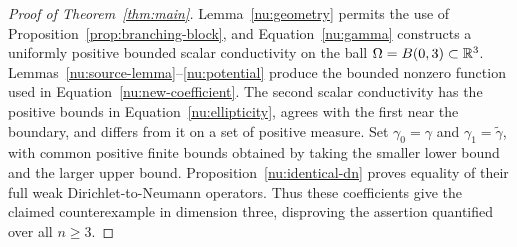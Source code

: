 \begin{proof}[Proof of Theorem~\ref{thm:main}]
Lemma~\ref{nu:geometry} permits the use of
Proposition~\ref{prop:branching-block}, and
Equation~\eqref{nu:gamma} constructs a uniformly positive bounded
scalar conductivity on the ball \(\Omega=B(0,3)\subset\mathbb R^3\).
Lemmas~\ref{nu:source-lemma}--\ref{nu:potential} produce the bounded
nonzero function used in Equation~\eqref{nu:new-coefficient}.
The second scalar conductivity has the positive bounds in
Equation~\eqref{nu:ellipticity}, agrees with the first near the
boundary, and differs from it on a set of positive measure.
Set $\gamma_0=\gamma$ and $\gamma_1=\widetilde\gamma$, with common
positive finite bounds obtained by taking the smaller lower bound
and the larger upper bound. Proposition~\ref{nu:identical-dn} proves
equality of their full weak Dirichlet-to-Neumann operators. Thus
these coefficients give the
claimed counterexample in dimension three, disproving the assertion
quantified over all \(n\ge3\).
\end{proof}

